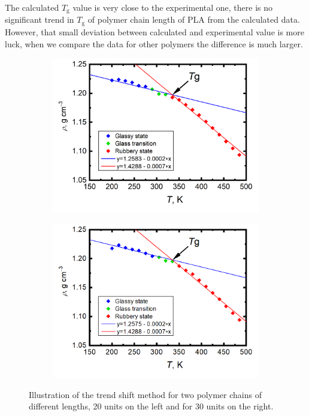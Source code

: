 The calculated $T_\mathrm{g}$ value is very close to the experimental one, there is no significant trend in $T_\mathrm{g}$ of polymer chain length of PLA from the calculated data. However, that small deviation between calculated and experimental value is more luck, when we compare the data for other polymers the difference is much larger.


\begin{figure}[H]
	\begin{subfigure}{0.5\textwidth}
		\includegraphics[width=1.0\linewidth]{img/vypocet_tg.png} 
	\end{subfigure}
	\begin{subfigure}{0.5\textwidth}
		\includegraphics[width=1.0\linewidth]{img/tg_ukazka_30.png} 
	\end{subfigure}   	
	\vspace{-1cm}
	\caption{Illustration of the trend shift method for two polymer chains of different lengths, 20 units on the left and for 30 units on the right.}
	\label{fig:illust}
\end{figure}

